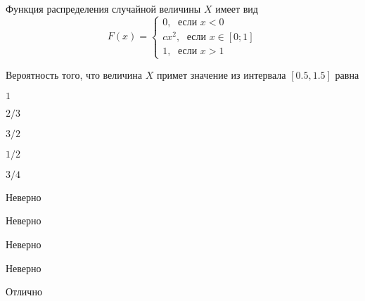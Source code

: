 
\begin{question}
Функция распределения случайной величины \(X\) имеет вид \[
F(x)=\begin{cases}
0, \; \text{ если } x<0 \\
cx^2, \; \text{ если } x\in [0;1] \\
1, \; \text{ если } x>1
\end{cases}
\]

\vspace{0.5cm}

Вероятность того, что величина \(X\) примет значение из интервала
\([0.5, 1.5]\) равна
\begin{answerlist}
  \item \(1\)
  \item \(2/3\)
  \item \(3/2\)
  \item \(1/2\)
  \item \(3/4\)
\end{answerlist}
\end{question}

\begin{solution}
\begin{answerlist}
  \item Неверно
  \item Неверно
  \item Неверно
  \item Неверно
  \item Отлично
\end{answerlist}
\end{solution}

